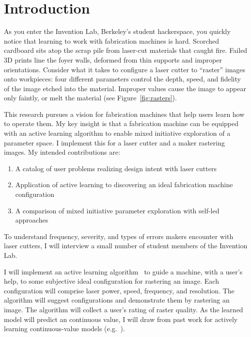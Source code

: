 \section{Introduction}


As you enter the Invention Lab, Berkeley's student hackerspace, you quickly notice that learning to work with fabrication machines is hard.
Scorched cardboard sits atop the scrap pile from laser-cut materials that caught fire.
Failed 3D prints line the foyer walls, deformed from thin supports and improper orientations.
Consider what it takes to configure a laser cutter to ``raster'' images onto workpieces:
four different parameters control the depth, speed, and fidelity of the image etched into the material.
Improper values cause the image to appear only faintly, or melt the material (see Figure~\ref{fig:rasters}).

This research pursues a vision for fabrication machines that help users learn how to operate them.
My key insight is that a fabrication machine can be equipped with an active learning algorithm to enable mixed initiative exploration of a parameter space.
I implement this for a laser cutter and a maker rastering images.
My intended contributions are:
\begin{enumerate}
\item A catalog of user problems realizing design intent with laser cutters
\item Application of active learning to discovering an ideal fabrication machine configuration
\item A comparison of mixed initiative parameter exploration with self-led approaches
\end{enumerate}

To understand frequency, severity, and types of errors makers encounter with laser cutters, I will interview a small number of student members of the Invention Lab.

I will implement an active learning algorithm~\cite{settles_active_2010} to guide a machine, with a user's help, to some subjective ideal configuration for rastering an image.
Each configuration will comprise laser power, speed, frequency, and resolution.
The algorithm will suggest configurations and demonstrate them by rastering an image.
The algorithm will collect a user's rating of raster quality.
As the learned model will predict an continuous value, I will draw from past work for actively learning continuous-value models (e.g.~\cite{sugiyama_active_2008}).

